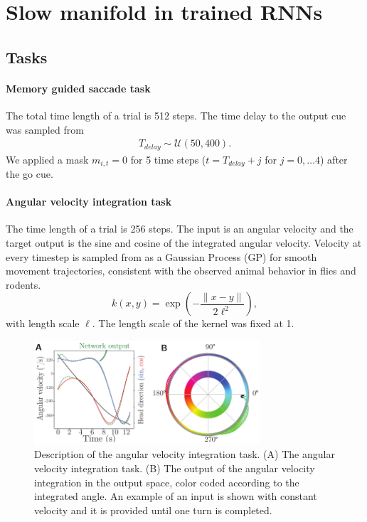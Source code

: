 \documentclass{article} %
\newcounter{ct}
\theoremstyle{definition}
\theoremstyle{remark}
\begin{document}
\newpage
\section{Slow manifold in trained RNNs}
\subsection{Tasks}\label{sec:supp:tasks}


\paragraph{Memory guided saccade task}

The total time length of a trial is 512 steps.
The time delay to the output cue was sampled from
\begin{align}
T_{delay} \sim \mathcal{U}(50, 400).
\end{align}
We applied a mask \(m_{i,t}=0\) for 5 time steps (\(t=T_{delay}+j\) for \(j=0,\dots 4\)) after the go cue.



\paragraph{Angular velocity integration task}
The time length of a trial is 256 steps.
The input is an angular velocity and the target output is the sine and cosine of the integrated angular velocity.
Velocity at every timestep  is sampled from as a Gaussian Process (GP) for smooth movement trajectories, consistent with the observed animal behavior in flies and rodents.
\begin{equation}
k(x,y)=\exp\left(-\frac{\|x-y\|}{2\ell^2}\right),
\end{equation}
with length scale \(\ell\).
 The length scale of the kernel was fixed at 1.

 \begin{figure}[tbhp]
     \centering
    \includegraphics[width=0.75\textwidth]{task_fig}
       \caption{Description of the angular velocity integration task.
        (A) The angular velocity integration task.
        (B) The output of the angular velocity integration in the output space, color coded according to the integrated angle. An example of an input is shown with constant velocity and it is provided until one turn is completed.
        }\label{fig:angular_task}
\end{figure}
\end{document}
